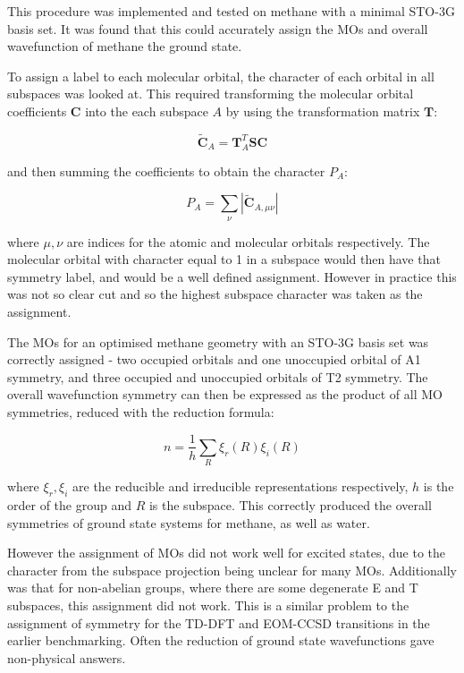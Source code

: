 This procedure was implemented and tested on methane with a minimal STO-3G basis set.
It was found that this could accurately assign the MOs and overall wavefunction of
methane the ground state.

To assign a label to each molecular orbital, the character of each orbital in all
subspaces was looked at. This required transforming the molecular orbital coefficients
$\mathbf{C}$ into the each subspace $A$ by using the transformation matrix $\mathbf{T}$:

\begin{equation}
\tilde{\mathbf{C}}_A = \mathbf{T}^T_A \mathbf{S} \mathbf{C}
\end{equation}

and then summing the coefficients to obtain the character $P_A$:

\begin{equation}
P_A = \sum_{\nu} \left\lvert \tilde{\mathbf{C}}_{A, \mu\nu} \right\lvert  
\end{equation}

where $\mu,\nu$ are indices for the atomic and molecular orbitals respectively. 
The molecular orbital with character equal to 1 in a subspace would then have that
symmetry label, and would be a well defined assignment. However in practice this was
not so clear cut and so the highest subspace character was taken as the assignment.

The MOs for an optimised methane geometry with an STO-3G basis set was correctly
assigned  - two occupied orbitals and one unoccupied orbital of A1 symmetry,
and three occupied and unoccupied orbitals of T2 symmetry. The overall wavefunction
symmetry can then be expressed as the product of all MO symmetries, reduced with
the reduction formula:

\begin{equation}
n = \frac{1}{h} \sum_R \xi_r \left( R \right) \xi_i \left( R \right)
\end{equation}

where $\xi_r, \xi_i$ are the reducible and irreducible representations respectively,
$h$ is the order of the group and $R$ is the subspace. This correctly produced
the overall symmetries of ground state systems for methane, as well as water.

However the assignment of MOs did not work well for excited states, due to the
character from the subspace projection being unclear for many MOs. 
Additionally was that for non-abelian groups, where there are some degenerate E
and T subspaces, this assignment did not work. This is a similar problem to the
assignment of symmetry for the TD-DFT and EOM-CCSD transitions in the earlier 
benchmarking. Often the reduction of ground state wavefunctions gave non-physical answers.

